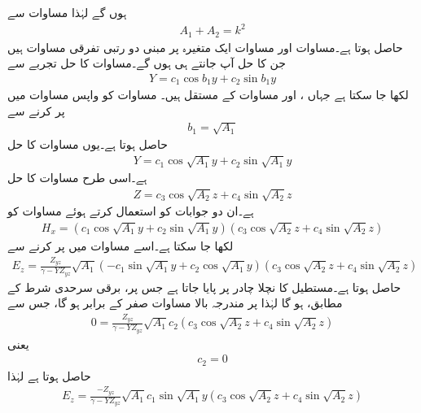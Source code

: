 ہوں گے لہٰذا مساوات  سے
\begin{align}\label{مساوات_مویج_مختلف_مستقل_تعلق}
A_1+A_2=k^2
\end{align}
حاصل ہوتا ہے۔مساوات  اور مساوات  ایک متغیرہ پر مبنی دو رتبی تفرقی مساوات ہیں جن کا حل آپ جانتے ہی ہوں گے۔مساوات  کا حل تجربے سے
\begin{align}\label{مساوات_مویج_موج_حل_الف}
Y=c_1 \cos b_1 y + c_2 \sin b_1 y
\end{align}
لکھا جا سکتا ہے جہاں ،  اور  مساوات کے مستقل ہیں۔ مساوات  کو واپس مساوات  میں پر کرنے سے
\begin{align*}
b_1=\sqrt{A_1}
\end{align*}
حاصل ہوتا ہے۔یوں  مساوات  کا حل
\begin{align}\label{مساوات_مویج_موج_حل_ب}
Y=c_1 \cos \sqrt{A_1} y + c_2 \sin \sqrt{A_1} y
\end{align}
ہے۔اسی طرح مساوات  کا حل
\begin{align}\label{مساوات_مویج_موج_حل_پ}
Z=c_3 \cos \sqrt{A_2} z + c_4 \sin \sqrt{A_2} z
\end{align}
ہے۔ان دو جوابات کو استعمال کرتے ہوئے مساوات  کو
\begin{align}\label{مساوات_مویج_موج_حل_ت}
H_x=\left(c_1 \cos \sqrt{A_1} y + c_2 \sin \sqrt{A_1} y\right) \left(c_3 \cos \sqrt{A_2} z + c_4 \sin \sqrt{A_2} z\right)
\end{align}
لکھا جا سکتا ہے۔اسے مساوات  میں پر کرنے سے
\begin{align*}
E_z=\frac{Z_{yz}}{\gamma-Y Z_{yz}} \sqrt{A_1}\left(-c_1 \sin \sqrt{A_1} y + c_2 \cos \sqrt{A_1} y\right) \left(c_3 \cos \sqrt{A_2} z + c_4 \sin \sqrt{A_2} z\right)
\end{align*}
حاصل ہوتا ہے۔مستطیل کا نچلا چادر  پر پایا جاتا ہے جس پر، برقی سرحدی شرط کے مطابق،  ہو گا لہٰذا  پر مندرجہ بالا مساوات صفر کے برابر ہو گا، جس سے
 \begin{align*}
0=\frac{Z_{yz}}{\gamma-Y Z_{yz}} \sqrt{A_1} c_2  \left(c_3 \cos \sqrt{A_2} z + c_4 \sin \sqrt{A_2} z\right)
\end{align*}
یعنی
\begin{align}
c_2=0
\end{align}
حاصل ہوتا ہے لہٰذا
\begin{align*}
E_z=\frac{-Z_{yz}}{\gamma-Y Z_{yz}} \sqrt{A_1}c_1 \sin \sqrt{A_1} y \left(c_3 \cos \sqrt{A_2} z + c_4 \sin \sqrt{A_2} z\right)
\end{align*}
